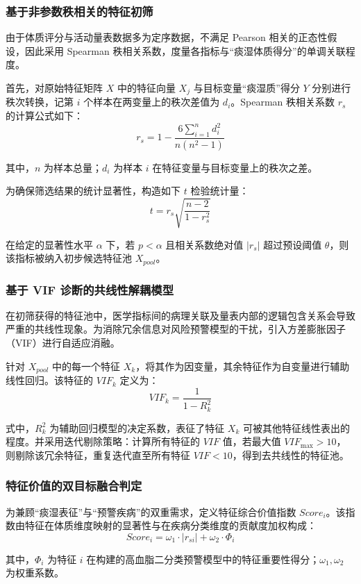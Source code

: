 \documentclass[12pt]{article}
\begin{document}
	\subsubsection{基于非参数秩相关的特征初筛}
	{\songti{}
		由于体质评分与活动量表数据多为定序数据，不满足 Pearson 相关的正态性假设，因此采用 Spearman 秩相关系数，度量各指标与“痰湿体质得分”的单调关联程度。
		
		首先，对原始特征矩阵 $X$ 中的特征向量 $X_j$ 与目标变量“痰湿质”得分 $Y$ 分别进行秩次转换，记第 $i$ 个样本在两变量上的秩次差值为 $d_i$。Spearman 秩相关系数 $r_s$ 的计算公式如下：
		\begin{equation}
			r_s = 1 - \frac{6 \sum_{i=1}^{n} d_i^2}{n(n^2 - 1)}
		\end{equation}
		\par}
	
	{\songti{}
		其中，$n$ 为样本总量；$d_i$ 为样本 $i$ 在特征变量与目标变量上的秩次之差。
		
		为确保筛选结果的统计显著性，构造如下 $t$ 检验统计量：
		\begin{equation}
			t = r_s \sqrt{\frac{n-2}{1-r_s^2}}
		\end{equation}
		
		在给定的显著性水平 $\alpha$ 下，若 $p < \alpha$ 且相关系数绝对值 $|r_s|$ 超过预设阈值 $\theta$，则该指标被纳入初步候选特征池 $X_{pool}$。\par}
	
	\subsubsection{基于 VIF 诊断的共线性解耦模型}
	{\songti{}
		在初筛获得的特征池中，医学指标间的病理关联及量表内部的逻辑包含关系会导致严重的共线性现象。为消除冗余信息对风险预警模型的干扰，引入方差膨胀因子（VIF）进行自适应消融。
		
		针对 $X_{pool}$ 中的每一个特征 $X_k$，将其作为因变量，其余特征作为自变量进行辅助线性回归。该特征的 $VIF_k$ 定义为：
		\begin{equation}
			VIF_k = \frac{1}{1 - R_k^2}
		\end{equation}
		
		式中，$R_k^2$ 为辅助回归模型的决定系数，表征了特征 $X_k$ 可被其他特征线性表出的程度。并采用迭代剔除策略：计算所有特征的 $VIF$ 值，若最大值 $VIF_{\max} > 10$，则剔除该冗余特征，重复迭代直至所有特征 $VIF < 10$，得到去共线性的特征池。\par}
	
	\subsubsection{特征价值的双目标融合判定}
	{\songti{}
		为兼顾“痰湿表征”与“预警疾病”的双重需求，定义特征综合价值指数 $Score_i$。该指数由特征在体质维度映射的显著性与在疾病分类维度的贡献度加权构成：
		\begin{equation}
			Score_i = \omega_1 \cdot |r_{si}| + \omega_2 \cdot \Phi_i
		\end{equation}
		
		其中，$\Phi_i$ 为特征 $i$ 在构建的高血脂二分类预警模型中的特征重要性得分；$\omega_1, \omega_2$ 为权重系数。\par}
	
\end{document}
